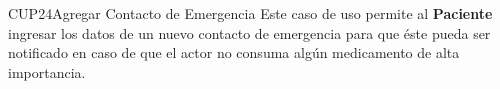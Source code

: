 \begin{UseCase}{CUP24}{Agregar Contacto de Emergencia}
    {
    	Este caso de uso permite al \textbf{Paciente} ingresar los datos de un nuevo contacto de emergencia para que éste pueda ser notificado en caso de que el actor no consuma algún medicamento de alta importancia.  
    }


\end{UseCase}
